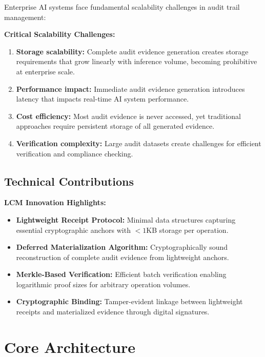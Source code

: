 \documentclass[12pt,a4paper]{article}
\begin{document}
Enterprise AI systems face fundamental scalability challenges in audit trail management:

\begin{riskbox}
\textbf{Critical Scalability Challenges:}
\begin{enumerate}[leftmargin=*, label=\arabic*.]
\item \textbf{Storage scalability:} Complete audit evidence generation creates storage requirements that grow linearly with inference volume, becoming prohibitive at enterprise scale.
\item \textbf{Performance impact:} Immediate audit evidence generation introduces latency that impacts real-time AI system performance.
\item \textbf{Cost efficiency:} Most audit evidence is never accessed, yet traditional approaches require persistent storage of all generated evidence.
\item \textbf{Verification complexity:} Large audit datasets create challenges for efficient verification and compliance checking.
\end{enumerate}
\end{riskbox}

\subsection{Technical Contributions}

\begin{valuebox}
\textbf{LCM Innovation Highlights:}
\begin{itemize}[leftmargin=*]
\item \textbf{Lightweight Receipt Protocol:} Minimal data structures capturing essential cryptographic anchors with $<\!1$KB storage per operation.
\item \textbf{Deferred Materialization Algorithm:} Cryptographically sound reconstruction of complete audit evidence from lightweight anchors.
\item \textbf{Merkle-Based Verification:} Efficient batch verification enabling logarithmic proof sizes for arbitrary operation volumes.
\item \textbf{Cryptographic Binding:} Tamper-evident linkage between lightweight receipts and materialized evidence through digital signatures.
\end{itemize}
\end{valuebox}

\section{Core Architecture}
\end{document}
